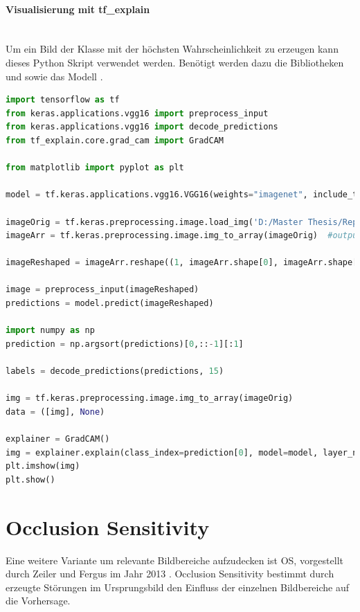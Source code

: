 \documentclass[
  12pt, %
  a4paper, %
  oneside, %
  openany, 
  numbers=noenddot, %
  BCOR=5mm, %
  parskip=half*, %
  thesis, %
]{bfhbook}
\newcommand{\parag}[1]{\paragraph*{#1}\mbox{}\\}
\begin{document}
\parag{Visualisierung mit tf\_explain}
\break
Um ein Bild der Klasse mit der höchsten Wahrscheinlichkeit zu erzeugen kann dieses Python Skript verwendet werden. Benötigt werden dazu die Bibliotheken \parencite{TensorFlow} und  \parencite{tfExplain} sowie das Modell \parencite{vgg16}.
\begin{lstlisting}[language=Python, caption=Grad CAM Visualisierung für die wahrscheinlichste Klasse]
import tensorflow as tf
from keras.applications.vgg16 import preprocess_input
from keras.applications.vgg16 import decode_predictions
from tf_explain.core.grad_cam import GradCAM

from matplotlib import pyplot as plt

model = tf.keras.applications.vgg16.VGG16(weights="imagenet", include_top=True)

imageOrig = tf.keras.preprocessing.image.load_img('D:/Master Thesis/Repo/Test Images/tabby.2.JPG', target_size=(224, 224))
imageArr = tf.keras.preprocessing.image.img_to_array(imageOrig)  #output Numpy-array

imageReshaped = imageArr.reshape((1, imageArr.shape[0], imageArr.shape[1], imageArr.shape[2]))

image = preprocess_input(imageReshaped)
predictions = model.predict(imageReshaped)

import numpy as np
prediction = np.argsort(predictions)[0,::-1][:1]

labels = decode_predictions(predictions, 15)

img = tf.keras.preprocessing.image.img_to_array(imageOrig)
data = ([img], None)
    
explainer = GradCAM()
img = explainer.explain(class_index=prediction[0], model=model, layer_name='block5_conv3', validation_data=data)
plt.imshow(img)
plt.show()
\end{lstlisting}

\section{Occlusion Sensitivity}
\label{os}
Eine weitere Variante um relevante Bildbereiche aufzudecken ist \Gls{OS}, vorgestellt durch Zeiler  und Fergus im Jahr 2013 \parencite{Zeiler2013}. Occlusion Sensitivity bestimmt durch erzeugte Störungen im Ursprungsbild den Einfluss der einzelnen Bildbereiche auf die Vorhersage.
\end{document}
